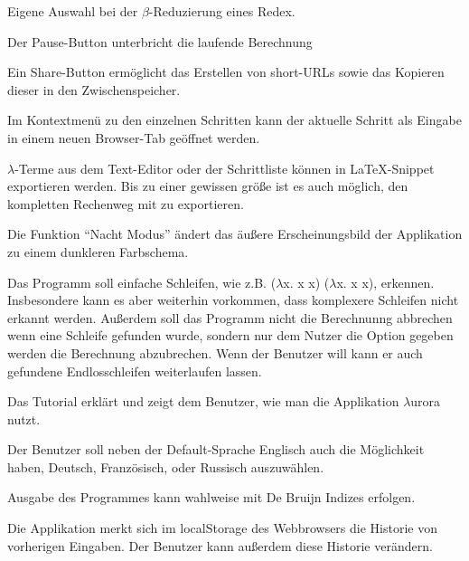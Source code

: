 \documentclass[parskip=full,11pt,twoside]{scrartcl}
\begin{document}
Eigene Auswahl bei der $\beta$-Reduzierung eines Redex.

Der Pause-Button unterbricht die laufende Berechnung

Ein Share-Button ermöglicht das Erstellen von short-URLs sowie das Kopieren dieser in den Zwischenspeicher.

Im Kontextmenü zu den einzelnen Schritten kann der aktuelle Schritt als Eingabe in einem neuen Browser-Tab geöffnet werden.

$\lambda$-Terme aus dem Text-Editor oder der Schrittliste können in LaTeX-Snippet exportieren werden. Bis zu einer gewissen größe ist es auch möglich, den kompletten Rechenweg mit zu exportieren.

Die Funktion \enquote{Nacht Modus} ändert das äußere Erscheinungsbild der Applikation zu einem dunkleren Farbschema.

Das Programm soll einfache Schleifen, wie z.B. ($\lambda$x. x x) ($\lambda$x. x x), erkennen. Insbesondere kann es aber weiterhin vorkommen, dass komplexere Schleifen nicht erkannt werden.
Außerdem soll das Programm nicht die Berechnunng abbrechen wenn eine Schleife gefunden wurde, sondern nur dem Nutzer die Option gegeben werden die Berechnung abzubrechen. Wenn der Benutzer  will kann er auch gefundene Endlosschleifen weiterlaufen lassen.

Das Tutorial erklärt und zeigt dem Benutzer, wie man die Applikation $\lambda$urora nutzt.

Der Benutzer soll neben der Default-Sprache Englisch auch die Möglichkeit haben, Deutsch, Französisch, oder Russisch auszuwählen.

Ausgabe des Programmes kann wahlweise mit De Bruijn Indizes erfolgen.

Die Applikation merkt sich im localStorage des Webbrowsers die Historie von vorherigen Eingaben. Der Benutzer kann außerdem diese Historie verändern.
\end{document}
